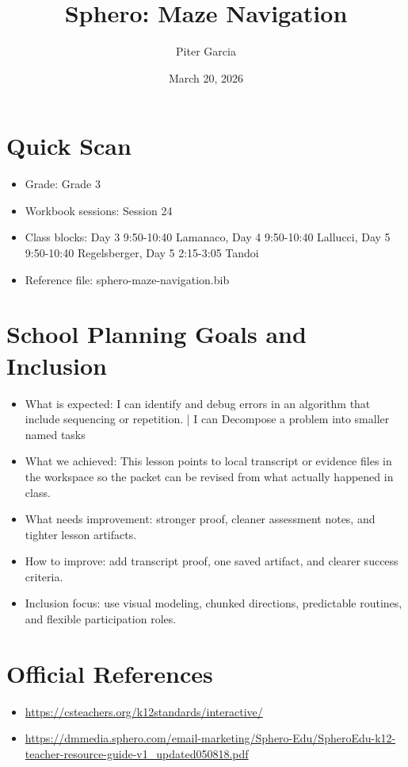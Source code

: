 \documentclass[11pt]{article}
\title{Sphero: Maze Navigation}
\author{Piter Garcia}
\date{March 20, 2026}
\begin{document}
    \maketitle
    \section*{Quick Scan}
    \begin{itemize}[leftmargin=*]
    \item Grade: Grade 3
    \item Workbook sessions: Session 24
    \item Class blocks: Day 3 9:50-10:40 Lamanaco, Day 4 9:50-10:40 Lallucci, Day 5 9:50-10:40 Regelsberger, Day 5 2:15-3:05 Tandoi
    \item Reference file: sphero-maze-navigation.bib
    \end{itemize}
    \section*{School Planning Goals and Inclusion}
    \begin{itemize}[leftmargin=*]
    \item What is expected: I can identify and debug errors in an algorithm that include sequencing or repetition. | I can Decompose a problem into smaller named tasks
    \item What we achieved: This lesson points to local transcript or evidence files in the workspace so the packet can be revised from what actually happened in class.
    \item What needs improvement: stronger proof, cleaner assessment notes, and tighter lesson artifacts.
    \item How to improve: add transcript proof, one saved artifact, and clearer success criteria.
    \item Inclusion focus: use visual modeling, chunked directions, predictable routines, and flexible participation roles.
    \end{itemize}
    \section*{Official References}
    \begin{itemize}[leftmargin=*]
    \item \url{https://csteachers.org/k12standards/interactive/}
\item \url{https://dmmedia.sphero.com/email-marketing/Sphero-Edu/SpheroEdu-k12-teacher-resource-guide-v1_updated050818.pdf}

    \end{itemize}
    
\end{document}
